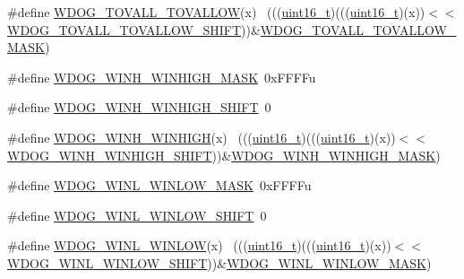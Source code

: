 \begin{DoxyCompactItemize}
\item 
\#define \hyperlink{group___w_d_o_g___register___masks_ga27f719a1e0f5bcf436739997e10499db}{W\+D\+O\+G\+\_\+\+T\+O\+V\+A\+L\+L\+\_\+\+T\+O\+V\+A\+L\+L\+OW}(x)                                ~(((\hyperlink{_p_e___types_8h_a1f1825b69244eb3ad2c7165ddc99c956}{uint16\+\_\+t})(((\hyperlink{_p_e___types_8h_a1f1825b69244eb3ad2c7165ddc99c956}{uint16\+\_\+t})(x))$<$$<$\hyperlink{group___w_d_o_g___register___masks_ga57ba2617b2855cd4b3d1eb0b3c878f52}{W\+D\+O\+G\+\_\+\+T\+O\+V\+A\+L\+L\+\_\+\+T\+O\+V\+A\+L\+L\+O\+W\+\_\+\+S\+H\+I\+FT}))\&\hyperlink{group___w_d_o_g___register___masks_ga71c3913b6be99b211a3c3031caf8ac66}{W\+D\+O\+G\+\_\+\+T\+O\+V\+A\+L\+L\+\_\+\+T\+O\+V\+A\+L\+L\+O\+W\+\_\+\+M\+A\+SK})
\item 
\#define \hyperlink{group___w_d_o_g___register___masks_ga6efef6fddbc8b8600a8dee5a24659068}{W\+D\+O\+G\+\_\+\+W\+I\+N\+H\+\_\+\+W\+I\+N\+H\+I\+G\+H\+\_\+\+M\+A\+SK}~0x\+F\+F\+F\+Fu
\item 
\#define \hyperlink{group___w_d_o_g___register___masks_ga362e7a13b632027b940135991c9d169b}{W\+D\+O\+G\+\_\+\+W\+I\+N\+H\+\_\+\+W\+I\+N\+H\+I\+G\+H\+\_\+\+S\+H\+I\+FT}~0
\item 
\#define \hyperlink{group___w_d_o_g___register___masks_gaf361b5b26d7ba7d6aa8491bdb494f4ac}{W\+D\+O\+G\+\_\+\+W\+I\+N\+H\+\_\+\+W\+I\+N\+H\+I\+GH}(x)                                      ~(((\hyperlink{_p_e___types_8h_a1f1825b69244eb3ad2c7165ddc99c956}{uint16\+\_\+t})(((\hyperlink{_p_e___types_8h_a1f1825b69244eb3ad2c7165ddc99c956}{uint16\+\_\+t})(x))$<$$<$\hyperlink{group___w_d_o_g___register___masks_ga362e7a13b632027b940135991c9d169b}{W\+D\+O\+G\+\_\+\+W\+I\+N\+H\+\_\+\+W\+I\+N\+H\+I\+G\+H\+\_\+\+S\+H\+I\+FT}))\&\hyperlink{group___w_d_o_g___register___masks_ga6efef6fddbc8b8600a8dee5a24659068}{W\+D\+O\+G\+\_\+\+W\+I\+N\+H\+\_\+\+W\+I\+N\+H\+I\+G\+H\+\_\+\+M\+A\+SK})
\item 
\#define \hyperlink{group___w_d_o_g___register___masks_gadc36bfdccd5e9c14d063a5b36b6a3f6a}{W\+D\+O\+G\+\_\+\+W\+I\+N\+L\+\_\+\+W\+I\+N\+L\+O\+W\+\_\+\+M\+A\+SK}~0x\+F\+F\+F\+Fu
\item 
\#define \hyperlink{group___w_d_o_g___register___masks_ga7f2baf848e4bfe9b0143d073467d1c1a}{W\+D\+O\+G\+\_\+\+W\+I\+N\+L\+\_\+\+W\+I\+N\+L\+O\+W\+\_\+\+S\+H\+I\+FT}~0
\item 
\#define \hyperlink{group___w_d_o_g___register___masks_ga7f530a06e58e70f3efd6955dfab8cec6}{W\+D\+O\+G\+\_\+\+W\+I\+N\+L\+\_\+\+W\+I\+N\+L\+OW}(x)                                        ~(((\hyperlink{_p_e___types_8h_a1f1825b69244eb3ad2c7165ddc99c956}{uint16\+\_\+t})(((\hyperlink{_p_e___types_8h_a1f1825b69244eb3ad2c7165ddc99c956}{uint16\+\_\+t})(x))$<$$<$\hyperlink{group___w_d_o_g___register___masks_ga7f2baf848e4bfe9b0143d073467d1c1a}{W\+D\+O\+G\+\_\+\+W\+I\+N\+L\+\_\+\+W\+I\+N\+L\+O\+W\+\_\+\+S\+H\+I\+FT}))\&\hyperlink{group___w_d_o_g___register___masks_gadc36bfdccd5e9c14d063a5b36b6a3f6a}{W\+D\+O\+G\+\_\+\+W\+I\+N\+L\+\_\+\+W\+I\+N\+L\+O\+W\+\_\+\+M\+A\+SK})
$$
\end{DoxyCompactItemize}

